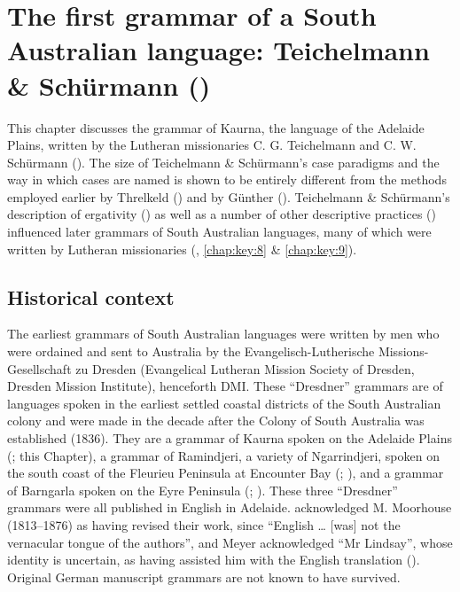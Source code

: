 
\chapter[The first grammar of a South Australian language]{The first grammar of a South Australian language: Teichelmann \& Schürmann (\citeyear{teichelmann_outlines_1840})}
\label{chap:key:5}



This chapter discusses the grammar of Kaurna, the language of the Adelaide Plains, written by the Lutheran missionaries C. G. Teichelmann and C. W. Schürmann (\citeyear{teichelmann_outlines_1840}). The size of Teichelmann \& Schürmann’s case paradigms and the way in which cases are named is shown to be entirely different from the methods employed earlier by Threlkeld () and by Günther (). Teichelmann \& Schürmann’s description of ergativity () as well as a number of other descriptive practices () influenced later grammars of South Australian languages, many of which were written by Lutheran missionaries (, \ref{chap:key:8} \& \ref{chap:key:9}).

\section{Historical context}
\label{sec:key:5.1}

The earliest grammars of South Australian languages were written by men who were ordained and sent to Australia by the Evangelisch-Lutherische Missions-Gesell\-schaft zu Dresden (Evangelical Lutheran Mission Society of Dresden, Dresden Mission Institute), henceforth DMI. These “Dresdner” grammars are of languages spoken in the earliest settled coastal districts of the South Australian colony and were made in the decade after the Colony of South Australia was established (1836). They are a grammar of Kaurna spoken on the Adelaide Plains (\citealt{teichelmann_outlines_1840}; this Chapter), a grammar of Ramindjeri, a variety of Ngarrindjeri, spoken on the south coast of the Fleurieu Peninsula at Encounter Bay (\citealt{meyer_vocabulary_1843}; ), and a grammar of Barngarla spoken on the Eyre Peninsula (\citealt{schurmann_letter_1844}; ). These three “Dresdner” grammars were all published in English in Adelaide. \citet[viii]{teichelmann_outlines_1840} acknowledged M. Moorhouse (1813--1876) as having revised their work, since “English … [was] not the vernacular tongue of the authors”, and Meyer acknowledged ``Mr Lindsay'', whose identity is uncertain, as having assisted him with the English translation (\citeyear[vi]{meyer_vocabulary_1843}). Original German manuscript grammars are not known to have survived.

